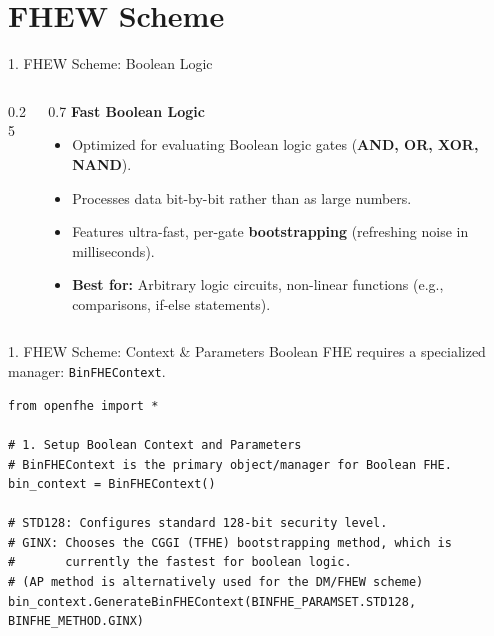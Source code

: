 \documentclass[aspectratio=169, 10pt]{beamer}
\begin{document}
\section{FHEW Scheme}
\begin{frame}{1. FHEW Scheme: Boolean Logic}
\begin{columns}[T]
\begin{column}{0.25\textwidth}
    \vspace{0.5cm}
    \centering
    \textcolor{DeepBlue}{\Huge \faMicrochip} \\ \vspace{0.3cm}
    \textcolor{AccentOrange}{\Large \faBolt}
\end{column}
\begin{column}{0.7\textwidth}
    \Large \textbf{Fast Boolean Logic} \\
    \normalsize \vspace{0.3cm}
    \begin{itemize}
        \item Optimized for evaluating Boolean logic gates (\textbf{AND, OR, XOR, NAND}).
        \item Processes data bit-by-bit rather than as large numbers.
        \item Features ultra-fast, per-gate \textbf{bootstrapping} (refreshing noise in milliseconds).
        \item \textbf{Best for:} Arbitrary logic circuits, non-linear functions (e.g., comparisons, if-else statements).
    \end{itemize}
\end{column}
\end{columns}
\end{frame}

\begin{frame}[fragile]{1. FHEW Scheme: Context \& Parameters}
Boolean FHE requires a specialized manager: \texttt{BinFHEContext}.
\vspace{0.2cm}
\begin{lstlisting}[firstnumber=1]
from openfhe import *

# 1. Setup Boolean Context and Parameters
# BinFHEContext is the primary object/manager for Boolean FHE.
bin_context = BinFHEContext()

# STD128: Configures standard 128-bit security level.
# GINX: Chooses the CGGI (TFHE) bootstrapping method, which is 
#       currently the fastest for boolean logic.
# (AP method is alternatively used for the DM/FHEW scheme)
bin_context.GenerateBinFHEContext(BINFHE_PARAMSET.STD128, BINFHE_METHOD.GINX)
\end{lstlisting}
\end{frame}
\end{document}
